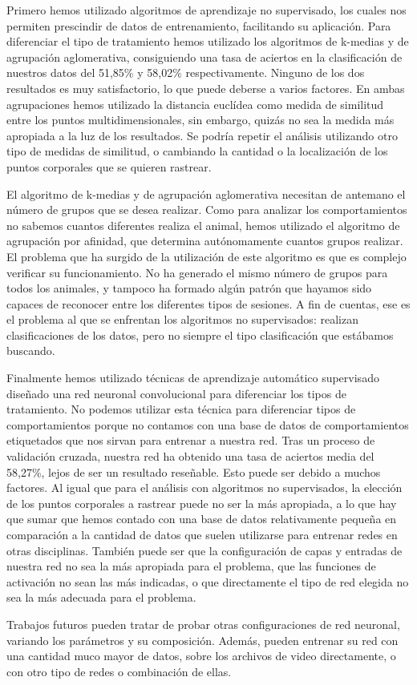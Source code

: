 Primero hemos utilizado algoritmos de aprendizaje no supervisado, los cuales  nos permiten prescindir de datos de entrenamiento, facilitando su aplicación. Para diferenciar el tipo de tratamiento hemos utilizado los algoritmos de k-medias y de agrupación aglomerativa, consiguiendo una tasa de aciertos en la clasificación de nuestros datos del 51,85\% y 58,02\% respectivamente. Ninguno de los dos resultados es muy satisfactorio, lo que puede deberse a varios factores. En ambas agrupaciones hemos utilizado la distancia euclídea como medida de similitud entre los puntos multidimensionales, sin embargo, quizás no sea la medida más apropiada a la luz de los resultados. Se podría repetir el análisis utilizando otro tipo de medidas de similitud, o cambiando la cantidad o la localización de los puntos corporales que se quieren rastrear.

El algoritmo de k-medias y de agrupación aglomerativa necesitan de antemano el número de grupos que se desea realizar. Como para analizar los comportamientos no sabemos cuantos diferentes realiza el animal, hemos utilizado el algoritmo de agrupación por afinidad, que determina autónomamente cuantos grupos realizar. El problema que ha surgido de la utilización de este algoritmo es que es complejo verificar su funcionamiento. No ha generado el mismo número de grupos para todos los animales, y tampoco ha formado algún patrón que hayamos sido capaces de reconocer entre los diferentes tipos de sesiones. A fin de cuentas, ese es el problema al que se enfrentan los algoritmos no supervisados: realizan clasificaciones de los datos, pero no siempre el tipo clasificación que estábamos buscando.

Finalmente hemos utilizado técnicas de aprendizaje automático supervisado diseñado una red neuronal convolucional para diferenciar los tipos de tratamiento. No podemos utilizar esta técnica para diferenciar tipos de comportamientos porque no contamos con una base de datos de comportamientos etiquetados que nos sirvan para entrenar a nuestra red. Tras un proceso de validación cruzada, nuestra red ha obtenido una tasa de aciertos media del 58,27\%, lejos de ser un resultado reseñable. Esto puede ser debido a muchos factores. Al igual que para el análisis con algoritmos no supervisados, la elección de los puntos corporales a rastrear puede no ser la más apropiada, a lo que hay que sumar que hemos contado con una base de datos relativamente pequeña en comparación a la cantidad de datos que suelen utilizarse para entrenar redes en otras disciplinas. También puede ser que la configuración de capas y entradas de nuestra red no sea la más apropiada para el problema, que las funciones de activación no sean las más indicadas, o que directamente el tipo de red elegida no sea la más adecuada para el problema.

Trabajos futuros pueden tratar de probar otras configuraciones de red neuronal, variando los parámetros y su composición. Además, pueden entrenar su red con una cantidad muco mayor de datos, sobre los archivos de video directamente, o con otro tipo de redes o combinación de ellas.